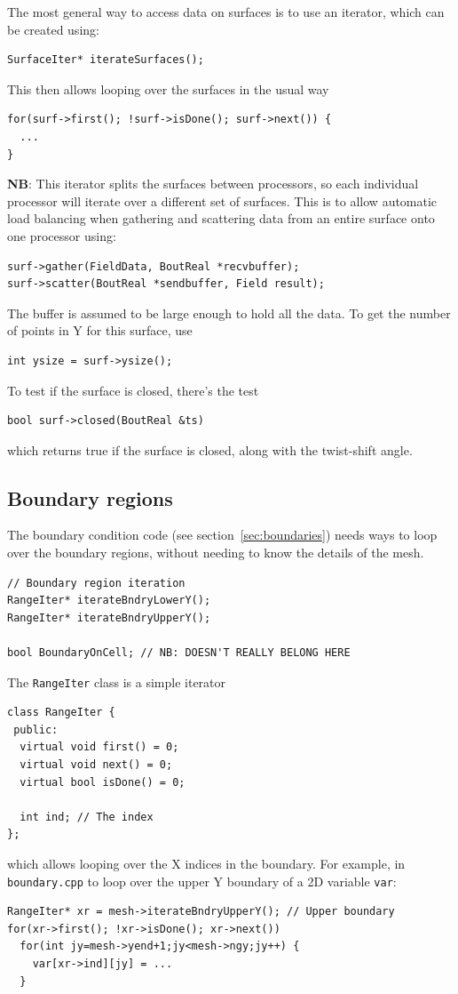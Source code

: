 \documentclass[12pt]{article}
\newcommand{\code}[1]{\texttt{#1}}
\begin{document}
The most general way to access data on surfaces is to use an
iterator, which can be created using:
\begin{lstlisting}
SurfaceIter* iterateSurfaces();
\end{lstlisting}
This then allows looping over the surfaces in the usual way
\begin{lstlisting}
for(surf->first(); !surf->isDone(); surf->next()) {
  ...
}
\end{lstlisting}
{\bf NB}: This iterator splits the surfaces between processors, so each
individual processor will iterate over a different set of surfaces. This
is to allow automatic load balancing when gathering and scattering data
from an entire surface onto one processor using:
\begin{lstlisting}
surf->gather(FieldData, BoutReal *recvbuffer);
surf->scatter(BoutReal *sendbuffer, Field result);
\end{lstlisting}
The buffer is assumed to be large enough to hold all the data. To 
get the number of points in Y for this surface, use
\begin{lstlisting}
int ysize = surf->ysize();
\end{lstlisting}
To test if the surface is closed, there's the test
\begin{lstlisting}
bool surf->closed(BoutReal &ts)
\end{lstlisting}
which returns true if the surface is closed, along with the twist-shift angle.

\subsection{Boundary regions}

The boundary condition code (see section~\ref{sec:boundaries}) needs
ways to loop over the boundary regions, without needing to know
the details of the mesh.

\begin{lstlisting}
// Boundary region iteration
RangeIter* iterateBndryLowerY();
RangeIter* iterateBndryUpperY();

bool BoundaryOnCell; // NB: DOESN'T REALLY BELONG HERE
\end{lstlisting}
  
The \code{RangeIter} class is a simple iterator 
\begin{lstlisting}
class RangeIter {
 public:
  virtual void first() = 0;
  virtual void next() = 0;
  virtual bool isDone() = 0;
  
  int ind; // The index
};
\end{lstlisting}
which allows looping over the X indices in the boundary. For example, in
\code{boundary.cpp} to loop over the upper Y boundary of a 2D variable
\code{var}:
\begin{lstlisting}
RangeIter* xr = mesh->iterateBndryUpperY(); // Upper boundary
for(xr->first(); !xr->isDone(); xr->next())
  for(int jy=mesh->yend+1;jy<mesh->ngy;jy++) {
    var[xr->ind][jy] = ...
  }
\end{lstlisting}
\end{document}
